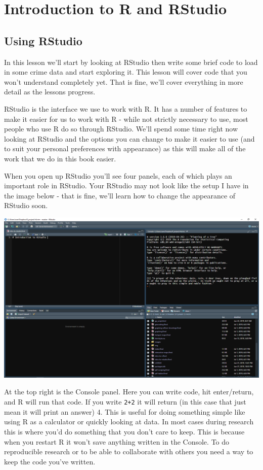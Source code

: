 \documentclass[
  12pt,
]{book}
\begin{document}
\hypertarget{introduction-to-r-and-rstudio}{%
\chapter{Introduction to R and RStudio}\label{introduction-to-r-and-rstudio}}

\hypertarget{using-rstudio}{%
\section{Using RStudio}\label{using-rstudio}}

In this lesson we'll start by looking at RStudio then write some brief code to load in some crime data and start exploring it. This lesson will cover code that you won't understand completely yet. That is fine, we'll cover everything in more detail as the lessons progress.

RStudio is the interface we use to work with R. It has a number of features to make it easier for us to work with R - while not strictly necessary to use, most people who use R do so through RStudio. We'll spend some time right now looking at RStudio and the options you can change to make it easier to use (and to suit your personal preferences with appearance) as this will make all of the work that we do in this book easier.

When you open up RStudio you'll see four panels, each of which plays an important role in RStudio. Your RStudio may not look like the setup I have in the image below - that is fine, we'll learn how to change the appearance of RStudio soon.

\includegraphics{images/rstudio_1.PNG}

At the top right is the Console panel. Here you can write code, hit enter/return, and R will run that code. If you write \texttt{2+2} it will return (in this case that just mean it will print an answer) 4. This is useful for doing something simple like using R as a calculator or quickly looking at data. In most cases during research this is where you'd do something that you don't care to keep. This is because when you restart R it won't save anything written in the Console. To do reproducible research or to be able to collaborate with others you need a way to keep the code you've written.
\end{document}
